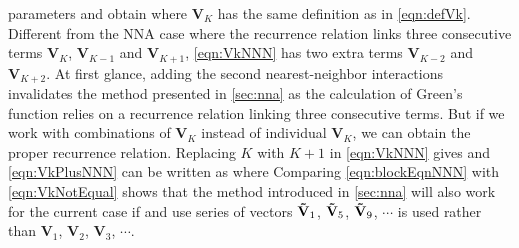 parameters and obtain
where $\mathbf{V}_{K}$ has the same definition as in \autoref{eqn:defVk}. Different from the NNA case where 
the recurrence relation links three consecutive terms $\mathbf{V}_{K}$, $\mathbf{V}_{K-1}$ and 
 $\mathbf{V}_{K+1}$, \autoref{eqn:VkNNN} has two extra terms $\mathbf{V}_{K-2}$ and 
 $\mathbf{V}_{K+2}$.  At first glance, adding the second nearest-neighbor interactions invalidates the method presented in \autoref{sec:nna} as the calculation of Green's 
function relies on a recurrence relation linking three consecutive terms. But if we work with combinations of 
$\mathbf{V}_K$ instead of individual $\mathbf{V}_K$, we can obtain the proper recurrence relation. Replacing $K$
with $K+1$ in \autoref{eqn:VkNNN} gives
 and \autoref{eqn:VkPlusNNN} can be written as
where
Comparing \autoref{eqn:blockEqnNNN} with \autoref{eqn:VkNotEqual} shows that the method introduced
in \autoref{sec:nna} will also work for the current case if 
and use series of vectors $\mathbf{\Tilde{V}}_{1}$, $\mathbf{\Tilde{V}}_{5}$, $\mathbf{\Tilde{V}}_{9}$,
 $\cdots$ is used rather than $\mathbf{V}_{1}$, $\mathbf{V}_{2}$, $\mathbf{V}_{3}$, $\cdots$.

